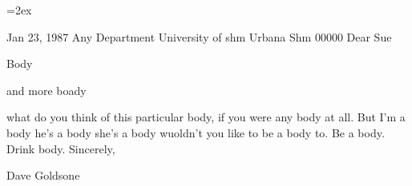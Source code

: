 \pagestyle{empty}
\parskip=2ex


\begin{titlepage}
\hfill Jan 23, 1987
\newline Any Department
\newline University of shm
\newline Urbana Shm \hspace{2em} 00000
\vfill
\noindent Dear Sue

Body

and more boady 

what do you think of this particular body, if you were any body at
all.  But I'm a body he's a body she's a body wuoldn't you like to be
a body to.  Be a body.  Drink body.
\vfill
\vfill
\hspace*{20em}Sincerely,

\vspace{3ex}
\hspace*{18em}Dave Goldsone

\vfill
\vfill
\vfill
\end{titlepage}
